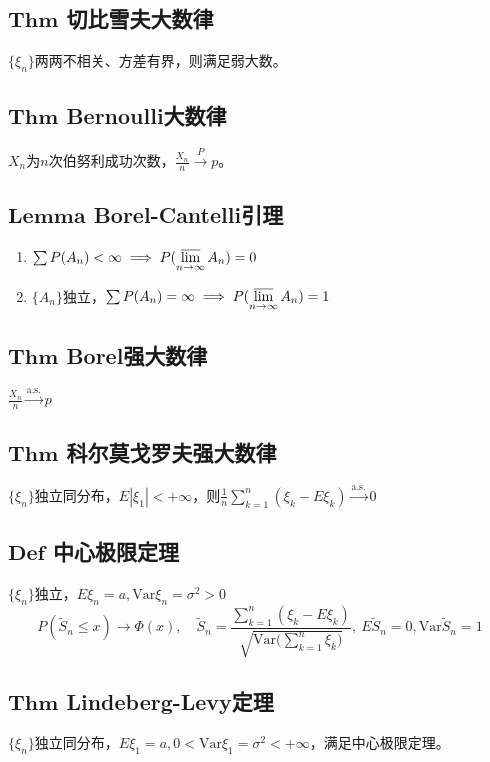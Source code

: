 \documentclass{article}
\begin{document}
	\subsection{$\bm{Thm}$ 切比雪夫大数律}
	$\{\xi_n\}$两两不相关、方差有界，则满足弱大数。
	\subsection{$\bm{Thm}$ Bernoulli大数律}
	$X_n$为$n$次伯努利成功次数，$\displaystyle\frac{X_n}{n}\stackrel{P}{\to}p$。
	\subsection{$\bm{Lemma}$ Borel-Cantelli引理}
	\begin{enumerate}
		\item $\sum P(A_n)<\infty\implies P(\varlimsup\limits_{n\to\infty} A_n)=0$
		\item $\{A_n\}$独立，$\sum P(A_n)=\infty\implies P(\varlimsup\limits_{n\to\infty} A_n)=1$
	\end{enumerate}
	\subsection{$\bm{Thm}$ Borel强大数律}
	$\displaystyle\frac{X_n}{n}\xrightarrow{\text{a.s.}}p$
	\subsection{$\bm{Thm}$ 科尔莫戈罗夫强大数律}
	$\{\xi_n\}$独立同分布，$E|\xi_1|<+\infty$，则$\displaystyle\frac1n\sum_{k=1}^n(\xi_k-E\xi_k)\xrightarrow{\text{a.s.}}0$
	\subsection{$\bm{Def}$ 中心极限定理}
	$\{\xi_n\}$独立，$E\xi_n=a,\mathrm{Var}\xi_n=\sigma^2>0$
	\[
	P(\tilde{S}_n\le x)\to\Phi(x),\quad \tilde{S}_n=\frac{\sum_{k=1}^n(\xi_k-E\xi_k)}{\sqrt{\mathrm{Var}\Big(\sum_{k=1}^n\xi_k\Big)}},\ E\tilde{S}_n=0,\mathrm{Var}\tilde{S}_n=1
	\]
	\subsection{$\bm{Thm}$ Lindeberg-Levy定理}
	$\{\xi_n\}$独立同分布，$E\xi_1=a,0<\mathrm{Var}\xi_1=\sigma^2<+\infty$，满足中心极限定理。
	
\end{document}
